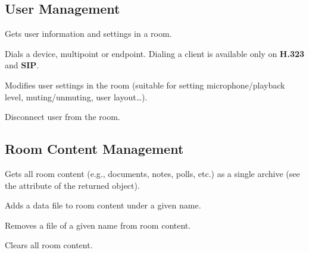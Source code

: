 \subsection{User Management}
\begin{Api}


Gets user information and settings in a room.

Dials a device, multipoint or endpoint. Dialing a client is available only on \textbf{H.323} and \textbf{SIP}.

Modifies user settings in the room (suitable for setting
microphone/playback level, muting/unmuting, user layout\ldots).

Disconnect user from the room.

\end{Api}


\subsection{Room Content Management}
\begin{Api}

Gets all room content (e.g., documents, notes, polls, etc.) as a single archive (see the  attribute of the returned object).

Adds a data file to room content under a given name.

Removes a file of a given name from room content.

Clears all room content.

\end{Api}


